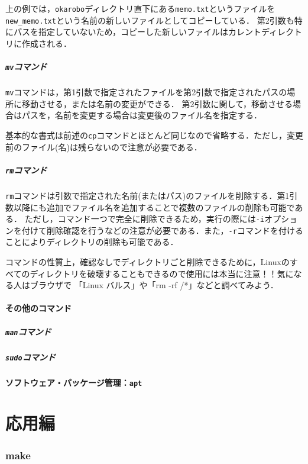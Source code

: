 \documentclass[autodetect-engine,dvi=dvipdfmx,ja=standard,a4j]{bxjsarticle}
\begin{document}
上の例では，\verb|okarobo|ディレクトリ直下にある\verb|memo.txt|というファイルを\verb|new_memo.txt|という名前の新しいファイルとしてコピーしている．
第2引数も特にパスを指定していないため，コピーした新しいファイルはカレントディレクトリに作成される．

\subsubsection{\texttt{mv}コマンド}
\verb|mv|コマンドは，第1引数で指定されたファイルを第2引数で指定されたパスの場所に移動させる，または名前の変更ができる．
第2引数に関して，移動させる場合はパスを，名前を変更する場合は変更後のファイル名を指定する．

基本的な書式は前述の\verb|cp|コマンドとほとんど同じなので省略する．ただし，変更前のファイル(名)は残らないので注意が必要である．

\subsubsection{\texttt{rm}コマンド}
\verb|rm|コマンドは引数で指定された名前(またはパス)のファイルを削除する．第1引数以降にも追加でファイル名を追加することで複数のファイルの削除も可能である．
ただし，コマンド一つで完全に削除できるため，実行の際には\verb|-i|オプションを付けて削除確認を行うなどの注意が必要である．また，\verb|-r|コマンドを付ける
ことによりディレクトリの削除も可能である．

コマンドの性質上，確認なしでディレクトリごと削除できるために，Linuxのすべてのディレクトリを破壊することもできるので使用には本当に注意！！気になる人はブラウザで
「Linux バルス」や「rm -rf /*」などと調べてみよう．

\subsection{その他のコマンド}

\subsubsection{\texttt{man}コマンド} \label{sec:cmd_man}

\subsubsection{\texttt{sudo}コマンド}

\subsection{ソフトウェア・パッケージ管理：\texttt{apt}}

\clearpage
\part{応用編}

\section{make}
\end{document}
